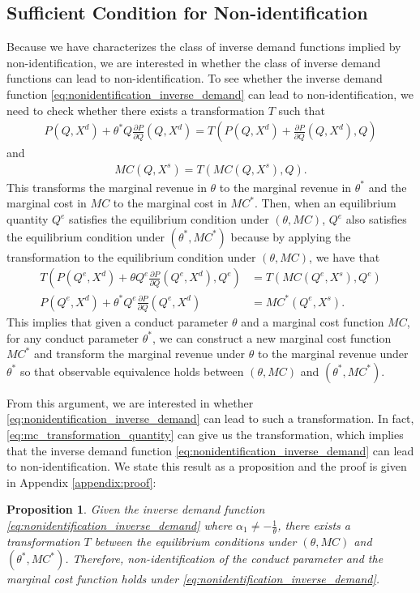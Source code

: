 \documentclass[11pt, a4paper]{article}
\newtheorem{proposition}{Proposition}
\theoremstyle{remark}
\begin{document}
\subsection{Sufficient Condition for Non-identification}
Because we have characterizes the class of inverse demand functions implied by non-identification, we are interested in whether the class of inverse demand functions can lead to non-identification.
To see whether the inverse demand function \eqref{eq:nonidentification_inverse_demand} can lead to non-identification, we need to check whether there exists a transformation $T$ such that
\begin{align}
    P(Q, X^{d}) + \theta^{*} Q \frac{\partial P}{\partial Q}(Q, X^{d}) = T\left(P(Q, X^{d}) + \frac{\partial P}{\partial Q}(Q, X^{d}), Q\right)
\end{align}
and
\begin{align}
    MC(Q, X^{s}) = T\left(MC(Q, X^{s}), Q\right).
\end{align}
This transforms the marginal revenue in $\theta$ to the marginal revenue in $\theta^{*}$ and the marginal cost in $MC$ to the marginal cost in $MC^{*}$.
Then, when an equilibrium quantity $Q^e$ satisfies the equilibrium condition under $(\theta, MC)$, $Q^e$ also satisfies the equilibrium condition under $(\theta^{*}, MC^{*})$ because by applying the transformation to the equilibrium condition under $(\theta, MC)$, we have that
\begin{align}
    T\left(P(Q^e, X^{d}) + \theta Q^e \frac{\partial P}{\partial Q}(Q^e, X^{d}), Q^e\right)&= T\left(MC(Q^e, X^{s}), Q^e\right)\\
    P(Q^e, X^{d}) + \theta^{*} Q^e \frac{\partial P}{\partial Q}(Q^e, X^{d})&= MC^{*}(Q^e, X^{s}).
\end{align}
This implies that given a conduct parameter $\theta$ and a marginal cost function $MC$, for any conduct parameter $\theta^{*}$, we can construct a new marginal cost function $MC^{*}$ and transform the marginal revenue under $\theta$ to the marginal revenue under $\theta^{*}$ so that observable equivalence holds between $(\theta, MC)$ and $(\theta^{*}, MC^{*})$.

From this argument, we are interested in whether \eqref{eq:nonidentification_inverse_demand} can lead to such a transformation.
In fact, \eqref{eq:mc_transformation_quantity} can give us the transformation, which implies that the inverse demand function \eqref{eq:nonidentification_inverse_demand} can lead to non-identification.
We state this result as a proposition and the proof is given in Appendix \ref{appendix:proof}:
\begin{proposition}\label{proposition:sufficient_nonidentification}
    Given the inverse demand function \eqref{eq:nonidentification_inverse_demand} where $\alpha_1 \ne -\frac{1}{\theta}$, there exists a transformation $T$ between the equilibrium conditions under $(\theta, MC)$ and $(\theta^{*}, MC^{*})$.
    Therefore, non-identification of the conduct parameter and the marginal cost function holds under \eqref{eq:nonidentification_inverse_demand}.
\end{proposition}
\end{document}
